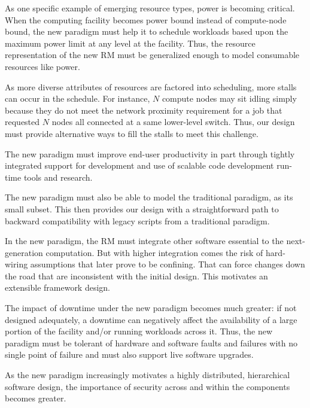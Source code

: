 \vspace{1ex}
 As one specific example of emerging
resource types, power is becoming critical. When the computing
facility becomes power bound instead of compute-node bound, 
the new paradigm must help it to schedule workloads based
upon the maximum power limit at any level at the facility. 
Thus, the resource representation of the new RM must be
generalized enough to model consumable resources like power.

\vspace{1ex}
 As more diverse attributes
of resources are factored into scheduling, more stalls can
occur in the schedule. For instance, $N$ compute nodes 
may sit idling simply because they do not meet the network
proximity requirement for a job that requested $N$ nodes
all connected at a same lower-level switch. Thus, our design
must provide alternative ways to fill the stalls
to meet this challenge.

\vspace{1ex}
 The new paradigm must improve
end-user productivity in part through tightly integrated 
support for development and use of scalable code development
run-time tools and research.

\vspace{1ex}
 The new paradigm must
also be able to model the traditional paradigm, as its small subset.
This then provides our design with a straightforward path
to backward compatibility with legacy scripts
from a traditional paradigm. %

\vspace{1ex}
 In the new paradigm, the RM must 
integrate other software essential to the next-generation
computation. But with higher integration comes the risk 
of hard-wiring assumptions that later prove to be confining. 
That can force changes down the road that are inconsistent
with the initial design. This motivates an extensible framework design.

\vspace{1ex}
 The impact of downtime under
the new paradigm becomes much greater: if not designed adequately,
a downtime can negatively affect the availability of a large portion
of the facility and/or running workloads across it. Thus, the new paradigm
must be tolerant of hardware and software faults and failures
with no single point of failure and must also support 
live software upgrades.

\vspace{1ex}
 As the new paradigm increasingly 
motivates a highly distributed, hierarchical software design, 
the importance of security across and within the components
becomes greater.

